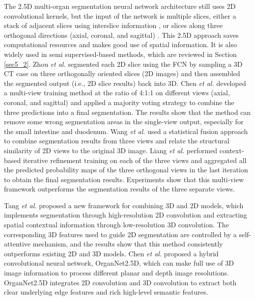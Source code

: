 \documentclass[lettersize,journal]{IEEEtran}
\begin{document}
The 2.5D multi-organ segmentation neural network architecture still uses 2D convolutional kernels, but the input of the network is multiple slices, either a stack of adjacent slices using interslice information \cite{64,89}, or slices along three orthogonal directions (axial, coronal, and sagittal) \cite{37,38,124,143}. This 2.5D approach saves computational resources and makes good use of spatial information. It is also widely used in semi supervised-based methods, which are reviewed in Section \ref{sec5_2}. Zhou {\it{et al.}} \cite{157} segmented each 2D slice using the FCN by sampling a 3D CT case on three orthogonally oriented slices (2D images) and then assembled the segmented output (i.e., 2D slice results) back into 3D. Chen {\it{et al.}} \cite{67} developed a multi-view training method at the ratio of 4:1:1 on different views (axial, coronal, and sagittal) and applied a majority voting strategy to combine the three predictions into a final segmentation. The results show that the method can remove some wrong segmentation areas in the single-view output, especially for the small intestine and duodenum. Wang {\it{et al.}} \cite{128} used a statistical fusion approach to combine segmentation results from three views and relate the structural similarity of 2D views to the original 3D image. Liang {\it{et al.}} \cite{143} performed context-based iterative refinement training on each of the three views and aggregated all the predicted probability maps of the three orthogonal views in the last iteration to obtain the final segmentation results. Experiments show that this multi-view framework outperforms the segmentation results of the three separate views.

Tang {\it{et al.}} \cite{68} proposed a new framework for combining 3D and 2D models, which implements segmentation through high-resolution 2D convolution and extracting spatial contextual information through low-resolution 3D convolution. The corresponding 3D features used to guide 2D segmentation are controlled by a self-attentive mechanism, and the results show that this method consistently outperforms existing 2D and 3D models. Chen {\it{et al.}} \cite{44} proposed a hybrid convolutional neural network, OrganNet2.5D, which can make full use of 3D image information to process different planar and depth image resolutions. OrganNet2.5D integrates 2D convolution and 3D convolution to extract both clear underlying edge features and rich high-level semantic features.
\end{document}
